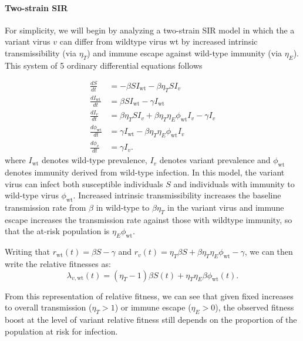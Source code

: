 \documentclass[12pt,oneside,letterpaper]{article}
\newcommand{\wt}{\text{wt}}
\begin{document}
\paragraph{Two-strain SIR}%

For simplicity, we will begin by analyzing a two-strain SIR model in which the a variant virus $v$ can differ from wildtype virus wt by increased intrinsic transmissibility (via $\eta_{T}$) and immune escape against wild-type immunity (via $\eta_{E}$).
This system of 5 ordinary differential equations follows

\begin{align*}
    \frac{d S}{d t} &= - \beta S I_{\wt} - \beta \eta_{T} S I_{v}\\
    \frac{d I_{\wt}}{dt} &= \beta S I_{\wt} - \gamma I_{\wt}\\
    \frac{d I_{v}}{dt} &= \beta \eta_{T} S I_{v} + \beta \eta_{T} \eta_{E} \phi_{\wt} I_{v} - \gamma I_{v}\\
    \frac{d \phi_{\wt}}{dt} &= \gamma I_{\wt} - \beta \eta_{T} \eta_{E} \phi_{\wt} I_{v}\\
    \frac{d \phi_{v}}{dt} &= \gamma I_{v}.
\end{align*}
where $I_{\wt}$ denotes wild-type prevalence, $I_{v}$ denotes variant prevalence and $\phi_{\wt}$ denotes immunity derived from wild-type infection.
In this model, the variant virus can infect both susceptible individuals $S$ and individuals with immunity to wild-type virus $\phi_{\wt}$.
Increased intrinsic transmissibility increases the baseline transmission rate from $\beta$ in wild-type to $\beta \eta_{T}$ in the variant virus and immune escape increases the transmission rate against those with wildtype immunity, so that the at-risk population is $\eta_{E} \phi_{\wt}$.

Writing that $r_{\wt}(t) = \beta S - \gamma$ and $r_{v}(t) = \eta_{T} \beta  S + \beta \eta_{T} \eta_{E} \phi_{\wt} - \gamma$, we can then write the relative fitnesses as:
\begin{equation} \label{eq:two_strain_relative_fitness}
\lambda_{v,\wt}(t) = (\eta_{T} - 1)\beta S(t) + \eta_{T} \eta_{E} \beta \phi_{\wt}(t).
\end{equation}

From this representation of relative fitness, we can see that given fixed increases to overall transmission ($\eta_{T} > 1$) or immune escape ($\eta_{E} > 0$), the observed fitness boost at the level of variant relative fitness still depends on the proportion of the population at risk for infection.
\end{document}

